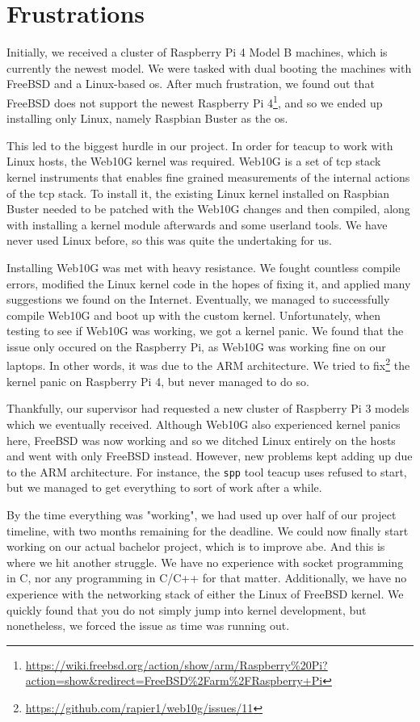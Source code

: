\section{Frustrations}

Initially, we received a cluster of Raspberry Pi 4 Model B machines, which is currently the newest model. We were tasked with dual booting the machines with FreeBSD and a Linux-based \gls{os}. After much frustration, we found out that FreeBSD does not support the newest Raspberry Pi 4\footnote{\url{https://wiki.freebsd.org/action/show/arm/Raspberry\%20Pi?action=show\&redirect=FreeBSD\%2Farm\%2FRaspberry+Pi}}, and so we ended up installing only Linux, namely Raspbian Buster as the \gls{os}.

This led to the biggest hurdle in our project. In order for \gls{teacup} to work with Linux hosts, the Web10G kernel was required. Web10G is a set of \gls{tcp} stack kernel instruments that enables fine grained measurements of the internal actions of the \gls{tcp} stack. To install it, the existing Linux kernel installed on Raspbian Buster needed to be patched with the Web10G changes and then compiled, along with installing a kernel module afterwards and some userland tools. We have never used Linux before, so this was quite the undertaking for us.

Installing Web10G was met with heavy resistance. We fought countless compile errors, modified the Linux kernel code in the hopes of fixing it, and applied many suggestions we found on the Internet. Eventually, we managed to successfully compile Web10G and boot up with the custom kernel. Unfortunately, when testing to see if Web10G was working, we got a kernel panic. We found that the issue only occured on the Raspberry Pi, as Web10G was working fine on our laptops. In other words, it was due to the ARM architecture. We tried to fix\footnote{\url{https://github.com/rapier1/web10g/issues/11}} the kernel panic on Raspberry Pi 4, but never managed to do so.

Thankfully, our supervisor had requested a new cluster of Raspberry Pi 3 models which we eventually received. Although Web10G also experienced kernel panics here, FreeBSD was now working and so we ditched Linux entirely on the hosts and went with only FreeBSD instead. However, new problems kept adding up due to the ARM architecture. For instance, the \lstinline{spp} tool \gls{teacup} uses refused to start, but we managed to get everything to sort of work after a while.

By the time everything was "working", we had used up over half of our project timeline, with two months remaining for the deadline. We could now finally start working on our actual bachelor project, which is to improve \gls{abe}. And this is where we hit another struggle. We have no experience with socket programming in C, nor any programming in C/C++ for that matter. Additionally, we have no experience with the networking stack of either the Linux of FreeBSD kernel. We quickly found that you do not simply jump into kernel development, but nonetheless, we forced the issue as time was running out.

